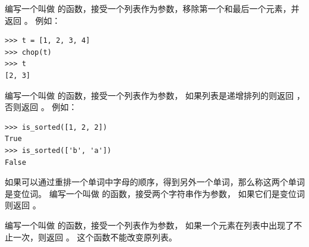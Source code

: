 \begin{exercise}


编写一个叫做  的函数，接受一个列表作为参数，移除第一个和最后一个元素，并返回 。
例如：

\begin{lstlisting}
>>> t = [1, 2, 3, 4]
>>> chop(t)
>>> t
[2, 3]
\end{lstlisting}

\end{exercise}


\begin{exercise}

编写一个叫做  的函数，接受一个列表作为参数，
如果列表是递增排列的则返回  ，否则返回 。
例如：

\begin{lstlisting}
>>> is_sorted([1, 2, 2])
True
>>> is_sorted(['b', 'a'])
False
\end{lstlisting}

\end{exercise}


\begin{exercise}
\label{anagram}



如果可以通过重排一个单词中字母的顺序，得到另外一个单词，那么称这两个单词是变位词。
编写一个叫做  的函数，接受两个字符串作为参数，
如果它们是变位词则返回  。
\end{exercise}



\begin{exercise}
\label{duplicate}
  


编写一个叫做  的函数，接受一个列表作为参数，
如果一个元素在列表中出现了不止一次，则返回  。
这个函数不能改变原列表。

\end{exercise}


